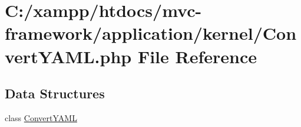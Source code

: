 \hypertarget{_convert_y_a_m_l_8php}{}\section{C\+:/xampp/htdocs/mvc-\/framework/application/kernel/\+Convert\+Y\+A\+ML.php File Reference}
\label{_convert_y_a_m_l_8php}
\subsection*{Data Structures}
\begin{DoxyCompactItemize}
\item 
class \hyperlink{class_convert_y_a_m_l}{Convert\+Y\+A\+ML}
\end{DoxyCompactItemize}
